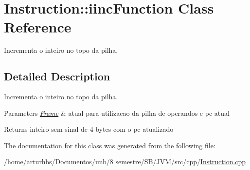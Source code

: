 \hypertarget{classInstruction_1_1iincFunction}{}\section{Instruction\+:\+:iinc\+Function Class Reference}
\label{classInstruction_1_1iincFunction}


Incrementa o inteiro no topo da pilha.  




\subsection{Detailed Description}
Incrementa o inteiro no topo da pilha. 


\begin{DoxyParams}{Parameters}
{\em \hyperlink{classFrame}{Frame}} & atual para utilizacao da pilha de operandos e pc atual \\
\hline
\end{DoxyParams}
\begin{DoxyReturn}{Returns}
inteiro sem sinal de 4 bytes com o pc atualizado 
\end{DoxyReturn}


The documentation for this class was generated from the following file\+:\begin{DoxyCompactItemize}
\item 
/home/arturhbs/\+Documentos/unb/8 semestre/\+S\+B/\+J\+V\+M/src/cpp/\hyperlink{Instruction_8cpp}{Instruction.\+cpp}\end{DoxyCompactItemize}

